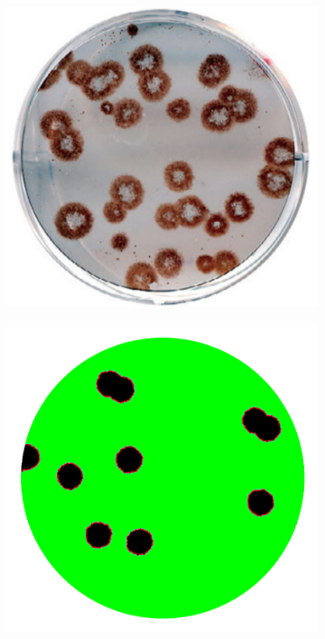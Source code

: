 \documentclass[a4paper]{article}
\begin{document}
\begin{figure}[h]
    \centering
    \begin{subfigure}[b]{0.4\linewidth}
        \includegraphics[width=1.0\linewidth]{Figures/plaques.pdf}
        \caption{}
        \label{fig:ActualPlaques}
    \end{subfigure}
    \begin{subfigure}[b]{0.4\linewidth}
        \includegraphics[width=1.0\linewidth]{Figures/cell145.png}

\end{subfigure}
\end{figure}
\end{document}
